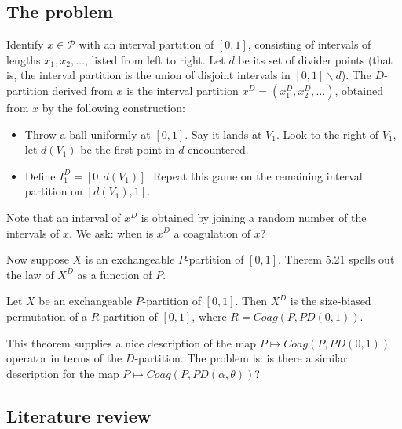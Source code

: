 \subsection{The problem}%

Identify $x \in \mathcal{P}$ with an interval partition of $[0,1]$, consisting of intervals of lengths $x_1, x_2, \ldots$, listed from left to right. Let $d$ be its set of divider points (that is, the interval partition is the union of disjoint intervals in $[0,1] \backslash d$). 
The $D$-partition derived from $x$ is the interval partition $x^D = (x^D_1, x^D_2, \ldots)$, obtained from $x$ by the following construction:
\begin{itemize}
  \item Throw a ball uniformly at $[0,1]$. Say it lands at $V_1$. Look to the right of $V_1$, let $d(V_1)$ be the first point in $d$ encountered. 
  \item Define $I^D_1 = [0,d(V_1)]$. Repeat this game on the remaining interval partition on $[d(V_1), 1]$. 
\end{itemize}
Note that an interval of $x^D$ is obtained by joining a random number of the intervals of $x$. We ask: when is $x^D$ a coagulation of $x$?

Now suppose $X$ is an exchangeable $P$-partition of $[0,1]$. Therem 5.21 spells out the law of $X^D$ as a function of $P$. 

\begin{theorem}\label{thm:5.21}
Let $X$ be an exchangeable $P$-partition of $[0,1]$. Then $X^D$ is the size-biased permutation of a $R$-partition of $[0,1]$, where $R = Coag(P,PD(0,1))$. 
\end{theorem}

This theorem supplies a nice description of the map $P \mapsto Coag(P,PD(0,1))$ operator in terms of the $D$-partition. The problem is: is there a similar description for the map $P \mapsto Coag(P,PD(\alpha,\theta))$? 

\subsection{Literature review} %

